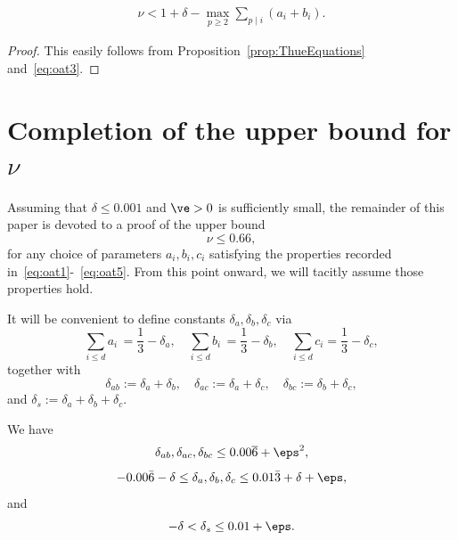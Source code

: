 \begin{proposition}\label{prop:ThueBound}
  \begin{align*}
  \nu < 1 +\delta- \max_{p\ge2}\sum_{p\mid i}(a_i+b_i).
  \end{align*}
\end{proposition}
\begin{proof}
  This easily follows from Proposition~\ref{prop:ThueEquations} and~\eqref{eq:oat3}.
\end{proof}

\section{Completion of the upper bound for \texorpdfstring{$\nu$}{nu}}

Assuming that
 $\delta\leq 0.001$ and
$\ve>0$ is sufficiently small,
the remainder of this paper is devoted to a proof of the upper bound
\[\nu \le 0.66,
\]
for any choice of parameters $a_i,b_i ,c_i$ satisfying the properties recorded in~\eqref{eq:oat1}-~\eqref{eq:oat5}.
From this point onward, we will tacitly assume those properties hold.

\begin{definition}\label{def:delta}
  \leanok
  It will be convenient to define constants $\delta_a,\delta_b,\delta_c$ via
  \begin{equation}\label{eq:ai1/3}
  \sum_{i\leq d} a_i \, = \frac{1}{3}-\delta_a, \quad \sum_{i\leq d} b_i \, = \frac{1}{3}-\delta_b, \quad \sum_{i\leq d} c_i = \frac{1}{3}-\delta_c,
  \end{equation}
  together with
  \begin{equation*}
    \delta_{ab}:=\delta_a+\delta_b,\quad \delta_{ac}:=\delta_a+\delta_c, \quad \delta_{bc}:=\delta_b+\delta_c,
  \end{equation*}
  and $\delta_s := \delta_a+\delta_b+\delta_c$.
\end{definition}

\begin{lemma}\label{lem:deltaBounds}
  \leanok
  We have
  \begin{equation}\label{eq:robin2}
  \delta_{ab}, \delta_{ac}, \delta_{bc} \leq 0.00\overline{6} + \eps^2,
  \end{equation}
  \begin{equation}\label{eq:robin1}
  -0.00\bar 6 - \delta \leq \delta_a,\delta_b,\delta_c \leq 0.01\bar3+\delta+\eps,
  \end{equation}
  and
  \begin{equation}\label{eq:robin3}
    -\delta < \delta_s \leq 0.01+\eps.
  \end{equation}
\end{lemma}

